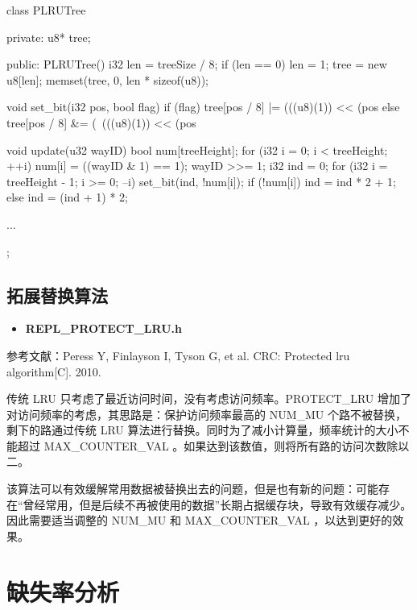 \documentclass{article}
\begin{document}
\begin{langbox}[C++]
class PLRUTree {
   private:
    u8* tree;

   public:
    PLRUTree() {
        i32 len = treeSize / 8;
        if (len == 0)
            len = 1;
        tree = new u8[len];
        memset(tree, 0, len * sizeof(u8));
    }

    void set_bit(i32 pos, bool flag) {
        if (flag) {
            tree[pos / 8] |= (((u8)(1)) << (pos %
        } else {
            tree[pos / 8] &= (~(((u8)(1)) << (pos %
        }
    }

    void update(u32 wayID) {
        bool num[treeHeight];
        for (i32 i = 0; i < treeHeight; ++i) {
            num[i] = ((wayID & 1) == 1);
            wayID >>= 1;
        }
        i32 ind = 0;
        for (i32 i = treeHeight - 1; i >= 0; --i) {
            set_bit(ind, !num[i]);
            if (!num[i]) {
                ind = ind * 2 + 1;
            } else {
                ind = (ind + 1) * 2;
            }
        }
    }

    ...
};
\end{langbox}



\subsection{拓展替换算法}




\begin{itemize}
\item
\textbf{REPL\_PROTECT\_LRU.h}
\end{itemize}



参考文献：Peress Y, Finlayson I, Tyson G, et al. CRC: Protected lru algorithm{[}C{]}. 2010.


传统 LRU 只考虑了最近访问时间，没有考虑访问频率。PROTECT\_LRU 增加了对访问频率的考虑，其思路是：保护访问频率最高的 NUM\_MU 个路不被替换，剩下的路通过传统 LRU 算法进行替换。同时为了减小计算量，频率统计的大小不能超过 MAX\_COUNTER\_VAL 。如果达到该数值，则将所有路的访问次数除以二。


该算法可以有效缓解常用数据被替换出去的问题，但是也有新的问题：可能存在“曾经常用，但是后续不再被使用的数据”长期占据缓存块，导致有效缓存减少。因此需要适当调整的 NUM\_MU 和 MAX\_COUNTER\_VAL ，以达到更好的效果。


\section{缺失率分析}
\end{document}
